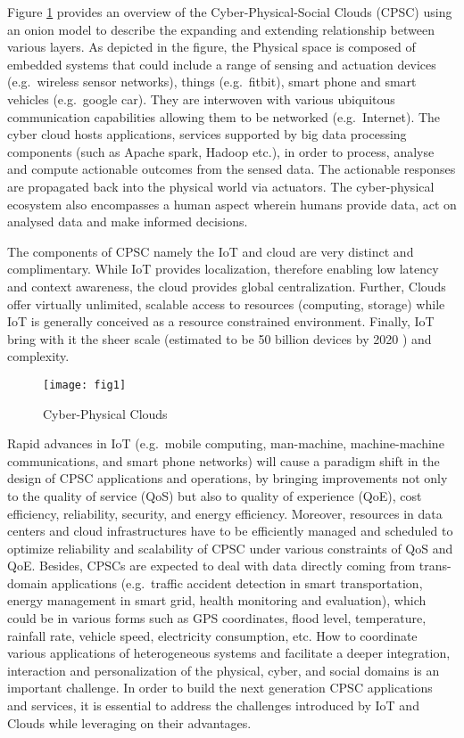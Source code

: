 Figure \ref{fig:fig1} provides an overview of the Cyber-Physical-Social Clouds (CPSC) using an onion model to describe the expanding and extending relationship between various layers.
As depicted in the figure, the Physical space is composed of embedded systems that could include a range of sensing and actuation devices (e.g.~wireless sensor networks),
things (e.g.~fitbit), smart phone and smart vehicles (e.g.~google car).
They are interwoven with various ubiquitous communication capabilities allowing them to be networked (e.g.~Internet).
The cyber cloud hosts applications, services supported by big data processing components (such as Apache spark, Hadoop etc.), in order to process, analyse and compute actionable outcomes from the sensed data.
The actionable responses are propagated back into the physical world via actuators.
The cyber-physical ecosystem also encompasses a human aspect wherein humans provide data, act on analysed data and make informed decisions. 

The components of CPSC namely the IoT and cloud are very distinct and complimentary.
While IoT provides localization, therefore enabling low latency and context awareness, the cloud provides global centralization.
Further, Clouds offer virtually unlimited, scalable access to resources (computing, storage) while IoT is generally conceived as a resource constrained environment.
Finally, IoT bring with it the sheer scale (estimated to be 50 billion devices by 2020 \cite{ref2}) and complexity.

\begin{figure}[htbp]
	\centering
    \texttt{[image: fig1]}
	\caption{Cyber-Physical Clouds}
	\label{fig:fig1}
\end{figure}

Rapid advances in IoT (e.g.~mobile computing, man-machine, machine-machine communications, and smart phone networks) will cause a paradigm shift in the design of CPSC applications and operations,
by bringing improvements not only to the quality of service (QoS) but also to quality of experience (QoE), cost efficiency, reliability, security, and energy efficiency.
Moreover, resources in data centers and cloud infrastructures have to be efficiently managed and scheduled to optimize reliability and scalability of CPSC under various constraints of QoS and QoE.
Besides, CPSCs are expected to deal with data directly coming from trans-domain applications (e.g.~traffic accident detection in smart transportation, energy management in smart grid, health monitoring and evaluation),
which could be in various forms such as GPS coordinates, flood level, temperature, rainfall rate, vehicle speed, electricity consumption, etc.
How to coordinate various applications of heterogeneous systems and facilitate a deeper integration, interaction and personalization of the physical, cyber, and social domains is an important challenge.
In order to build the next generation CPSC applications and services, it is essential to address the challenges introduced by IoT and Clouds while leveraging on their advantages.


